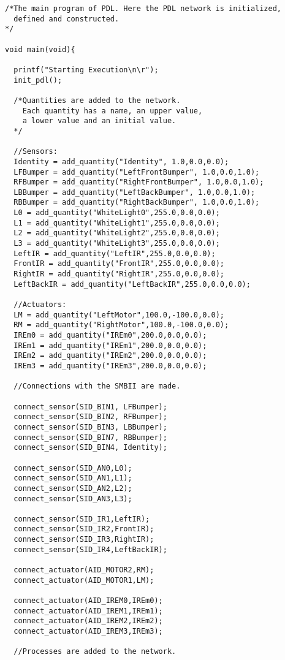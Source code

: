 \begin{lstlisting}
/*The main program of PDL. Here the PDL network is initialized,
  defined and constructed.
*/

void main(void){

  printf("Starting Execution\n\r");
  init_pdl();

  /*Quantities are added to the network.
    Each quantity has a name, an upper value,
    a lower value and an initial value.
  */
     
  //Sensors:
  Identity = add_quantity("Identity", 1.0,0.0,0.0);
  LFBumper = add_quantity("LeftFrontBumper", 1.0,0.0,1.0);
  RFBumper = add_quantity("RightFrontBumper", 1.0,0.0,1.0);
  LBBumper = add_quantity("LeftBackBumper", 1.0,0.0,1.0);
  RBBumper = add_quantity("RightBackBumper", 1.0,0.0,1.0);
  L0 = add_quantity("WhiteLight0",255.0,0.0,0.0);
  L1 = add_quantity("WhiteLight1",255.0,0.0,0.0);
  L2 = add_quantity("WhiteLight2",255.0,0.0,0.0);
  L3 = add_quantity("WhiteLight3",255.0,0.0,0.0);
  LeftIR = add_quantity("LeftIR",255.0,0.0,0.0);
  FrontIR = add_quantity("FrontIR",255.0,0.0,0.0);
  RightIR = add_quantity("RightIR",255.0,0.0,0.0);
  LeftBackIR = add_quantity("LeftBackIR",255.0,0.0,0.0);

  //Actuators:
  LM = add_quantity("LeftMotor",100.0,-100.0,0.0);
  RM = add_quantity("RightMotor",100.0,-100.0,0.0);  
  IREm0 = add_quantity("IREm0",200.0,0.0,0.0);
  IREm1 = add_quantity("IREm1",200.0,0.0,0.0);
  IREm2 = add_quantity("IREm2",200.0,0.0,0.0);
  IREm3 = add_quantity("IREm3",200.0,0.0,0.0);

  //Connections with the SMBII are made.

  connect_sensor(SID_BIN1, LFBumper);
  connect_sensor(SID_BIN2, RFBumper);
  connect_sensor(SID_BIN3, LBBumper);
  connect_sensor(SID_BIN7, RBBumper);
  connect_sensor(SID_BIN4, Identity);

  connect_sensor(SID_AN0,L0);
  connect_sensor(SID_AN1,L1);
  connect_sensor(SID_AN2,L2);
  connect_sensor(SID_AN3,L3);
  
  connect_sensor(SID_IR1,LeftIR);
  connect_sensor(SID_IR2,FrontIR);
  connect_sensor(SID_IR3,RightIR);
  connect_sensor(SID_IR4,LeftBackIR);
  
  connect_actuator(AID_MOTOR2,RM);
  connect_actuator(AID_MOTOR1,LM);
  
  connect_actuator(AID_IREM0,IREm0);
  connect_actuator(AID_IREM1,IREm1);
  connect_actuator(AID_IREM2,IREm2);
  connect_actuator(AID_IREM3,IREm3);

  //Processes are added to the network.


\end{lstlisting}
